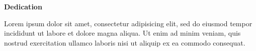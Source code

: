 
\clearpage
{}
{}
\begin{adjustwidth}{0.1\textwidth}{0.1\textwidth}
\begingroup
\null\vspace{0.2\textheight}
\begin{center}
{\bfseries\Large Dedication}\par\vspace{2em}

Lorem ipsum dolor sit amet, consectetur adipisicing elit, sed do eiusmod tempor incididunt ut labore et dolore magna aliqua. Ut enim ad minim veniam, quis nostrud exercitation ullamco laboris nisi ut aliquip ex ea commodo consequat.
\end{center}
\endgroup
\end{adjustwidth}
\clearpage